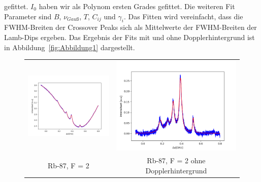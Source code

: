 \documentclass[a4paper,parskip]{scrartcl}
\begin{document}
gefittet. $I_0$ haben wir als Polynom ersten Grades gefittet. Die weiteren Fit Parameter sind $B$, $\nu_{Gauß}$, $T$, $C_{ij}$ und $\gamma_i$. Das Fitten wird vereinfacht, dass die FWHM-Breiten der Crossover Peaks sich als Mittelwerte der FWHM-Breiten der Lamb-Dips ergeben. Das Ergebnis der Fits mit und ohne Dopplerhintergrund ist in Abbildung~\ref{fig:Abbildung1} dargestellt.

\begin{figure}[p]
\centering
\begin{tabular}{cc}
    \includegraphics[scale = 0.45]{./saturation/peak1/fit.png}  &  \includegraphics[scale = 0.45]{./saturation/peak1/gaussCorrected.png}  \\
    {\footnotesize Rb-87, F = 2} & {\footnotesize Rb-87, F = 2 ohne Dopplerhintergrund}  \\

\end{tabular}
\end{figure}
\end{document}
